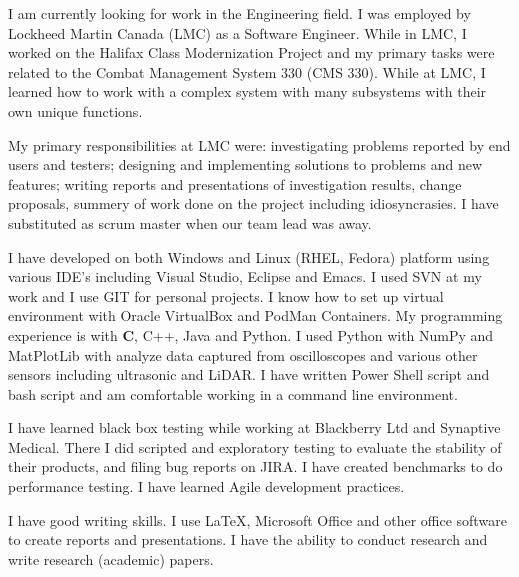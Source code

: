 I am currently looking for work in the Engineering field. I was employed by Lockheed Martin Canada (LMC) as a Software Engineer. While in LMC, I worked on the Halifax Class Modernization Project and my primary tasks were related to the Combat Management System 330 (CMS 330). While at LMC, I learned how to work with a complex system with many subsystems with their own unique functions.

My primary responsibilities at LMC were: investigating problems reported by end users and testers; designing and implementing solutions to problems and new features; writing reports and presentations of investigation results, change proposals, summery of work done on the project including idiosyncrasies. I have substituted as scrum master when our team lead was away.

I have developed on both Windows and Linux (RHEL, Fedora) platform using various IDE's including Visual Studio, Eclipse and Emacs. I used SVN at my work and I use GIT for personal projects. I know how to set up virtual environment with Oracle VirtualBox and PodMan Containers. My programming experience is with \textbf{C}, C++, Java and Python.
I used Python with NumPy and MatPlotLib with analyze data captured from oscilloscopes and various other sensors including ultrasonic and LiDAR. I have written Power Shell script and bash script and am comfortable working in a command line environment.

I have learned black box testing while working at Blackberry Ltd and Synaptive Medical. There I did scripted and exploratory testing to evaluate the stability of their products, and filing bug reports on JIRA. I have created benchmarks to do performance testing. I have learned Agile development practices.

I have good writing skills. I use \LaTeX, Microsoft Office and other office software to create reports and presentations. I have the ability to conduct research and write research (academic) papers.
